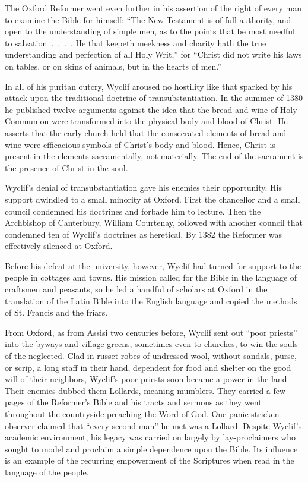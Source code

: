 
The Oxford Reformer went even further in his assertion of the right of every man to examine the
Bible for himself: “The New Testament is of full authority, and open to the understanding of simple
men, as to the points that be most needful to salvation~.~.~.~. He that keepeth meekness and charity
hath the true understanding and perfection of all Holy Writ,” for “Christ did not write his laws on
tables, or on skins of animals, but in the hearts of men.”

In all of his puritan outcry, Wyclif aroused no hostility like that sparked by his attack upon the
traditional doctrine of transubstantiation. In the summer of 1380 he published twelve arguments
against the idea that the bread and wine of Holy Communion were transformed into the physical body
and blood of Christ. He asserts that the early church held that the consecrated elements of bread
and wine were efficacious symbols of Christ’s body and blood. Hence, Christ is present in the
elements sacramentally, not materially. The end of the sacrament is the presence of Christ in the
soul.

Wyclif’s denial of transubstantiation gave his enemies their opportunity. His support dwindled to a
small minority at Oxford. First the chancellor and a small council condemned his doctrines and
forbade him to lecture. Then the Archbishop of Canterbury, William Courtenay, followed with another
council that condemned ten of Wyclif’s doctrines as heretical. By 1382 the Reformer was effectively
silenced at Oxford.

Before his defeat at the university, however, Wyclif had turned for support to the people in
cottages and towns. His mission called for the Bible in the language of craftsmen and peasants, so
he led a handful of scholars at Oxford in the translation of the Latin Bible into the English
language and copied the methods of St. Francis and the friars.

From Oxford, as from Assisi two centuries before, Wyclif sent out “poor priests” into the byways and
village greens, sometimes even to churches, to win the souls of the neglected. Clad in russet robes
of undressed wool, without sandals, purse, or scrip, a long staff in their hand, dependent for food
and shelter on the good will of their neighbors, Wyclif’s poor priests soon became a power in the
land. Their enemies dubbed them Lollards, meaning mumblers. They carried a few pages of the
Reformer’s Bible and his tracts and sermons as they went throughout the countryside preaching the
Word of God. One panic-stricken observer claimed that “every second man” he met was a Lollard.
Despite Wyclif’s academic environment, his legacy was carried on largely by lay-proclaimers who
sought to model and proclaim a simple dependence upon the Bible. Its influence is an example of the
recurring empowerment of the Scriptures when read in the language of the people.


